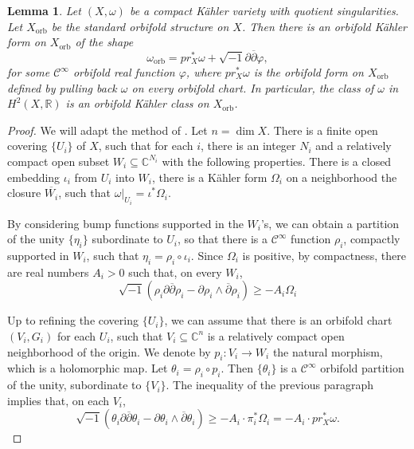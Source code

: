 \documentclass[12pt]{amsart}
\newcommand{\<}{\leq}
\def\>{\geq}
\newtheorem{lemma}[theorem]{Lemma}
\theoremstyle{remark}
\theoremstyle{definition}
\theoremstyle{definition}
\numberwithin{equation}{section}
\theoremstyle{definition}
\theoremstyle{definition}
\def\dim{\operatorname{dim}}
\def\orb{\mathrm{orb}}
\begin{document}
\begin{lemma}
\label{lemma:construction-orb-kahler}
Let $(X,\omega)$ be a compact K\"ahler variety with quotient singularities. 
Let $X_{\orb}$ be the standard orbifold structure on $X$. 
Then there is an orbifold K\"ahler form on $X_{\orb}$ of the shape 
\[
\omega_{\orb} = pr_X^* \omega + \sqrt{-1}\partial\overline{\partial} \varphi, 
\]
for some $\mathcal{C}^{\infty}$ orbifold real function $\varphi$, where $pr_X^*\omega$ is the orbifold form on $X_{\orb}$ defined by pulling back  $\omega$ on every orbifold chart.  
In particular, the class of $\omega$ in $H^{2}(X,\mathbb{R})$ is an orbifold K\"ahler class on $X_{\orb}$.
\end{lemma}

\begin{proof}
We will adapt the method of   \cite[Lemma 3.5]{Dem92}. 
Let  $n=\dim X$. 
There is a finite open covering $\{U_i\}$ of $X$, such that 
for each $i$, there is an integer $N_i$ and a relatively compact open subset $W_i\subseteq \mathbb{C}^{N_i}$ with the following properties. 
There is a closed embedding  $\iota_i$ from $U_i$ into $W_i$, there is a K\"ahler form $\Omega_i$ on a neighborhood the closure $\overline{W_i}$,  such that 
$\omega|_{U_i} = \iota^*\Omega_i.$ 

By considering bump functions supported in the $W_i$'s, we can  obtain a partition of the unity $\{\eta_i\}$ subordinate to $U_i$, so that there is a $\mathcal{C}^{\infty}$ function $\rho_i$, compactly supported in $W_i$, such that $\eta_i = \rho_i\circ \iota_i$. 
Since $\Omega_i$ is positive, by compactness, there are real numbers $A_i>0$ such that, on every $W_i$,   
\[
\sqrt{-1}( \rho_i \partial\overline{\partial} \rho_i - \partial \rho_i \wedge \overline{\partial} \rho_i  )
\> -A_i \Omega_i
\]



Up to refining the covering $\{U_i\}$, we can assume that there is an orbifold chart $(V_i,G_i)$ for each $U_i$, such that $V_i\subseteq \mathbb{C}^n$ is a relatively compact open  neighborhood of the origin. 
We denote by $p_i \colon V_i \to W_i$ the natural morphism, which is a holomorphic map. 
Let $\theta_i = \rho_i \circ p_i$. 
Then $\{\theta_i\}$ is a $\mathcal{C}^{\infty}$ orbifold  partition of the unity, subordinate to $\{V_i\}$.  
The inequality of the previous paragraph implies that, on each $V_i$,  
\[
\sqrt{-1}( \theta_i \partial\overline{\partial} \theta_i - \partial \theta_i \wedge \overline{\partial} \theta_i  )
\> -A_i \cdot \pi_i^*\Omega_i = -A_i \cdot  pr_X^*\omega.
\]
 


\end{proof}
\end{document}
